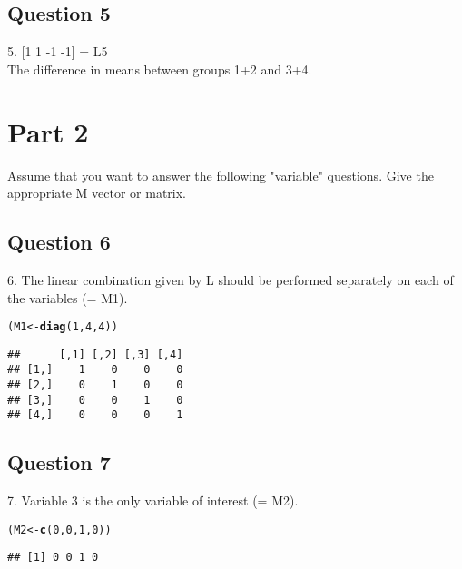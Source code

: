 \documentclass{article}\usepackage[]{graphicx}\usepackage[]{color}
\makeatletter
\newcommand{\hlnum}[1]{\textcolor[rgb]{0.686,0.059,0.569}{#1}}%
\newcommand{\hlstd}[1]{\textcolor[rgb]{0.345,0.345,0.345}{#1}}%
\newcommand{\hlkwb}[1]{\textcolor[rgb]{0.69,0.353,0.396}{#1}}%
\newcommand{\hlkwd}[1]{\textcolor[rgb]{0.737,0.353,0.396}{\textbf{#1}}}%
\newenvironment{kframe}{%
 \def\at@end@of@kframe{}%
 \ifinner\ifhmode%
  \def\at@end@of@kframe{\end{minipage}}%
  \begin{minipage}{\columnwidth}%
 \fi\fi%
 \def\FrameCommand##1{\hskip\@totalleftmargin \hskip-\fboxsep
 \colorbox{shadecolor}{##1}\hskip-\fboxsep
     \hskip-\linewidth \hskip-\@totalleftmargin \hskip\columnwidth}%
 \MakeFramed {\advance\hsize-\width
   \@totalleftmargin\z@ \linewidth\hsize
   \@setminipage}}%
 {\par\unskip\endMakeFramed%
 \at@end@of@kframe}
\newenvironment{knitrout}{}{} %
\makeatother
\begin{document}
\subsection{Question 5}
5. [1 1 -1 -1] = L5\\
The difference in means between groups 1+2 and 3+4.

\section{Part 2}
Assume that you want to answer the following "variable" questions. Give the appropriate M vector or matrix.  
\subsection{Question 6}
6. The linear combination given by L should be performed separately on each of the variables (= M1).

\begin{knitrout}
\color{fgcolor}\begin{kframe}
\begin{alltt}
\hlstd{(M1} \hlkwb{<-} \hlkwd{diag}\hlstd{(}\hlnum{1}\hlstd{,} \hlnum{4}\hlstd{,} \hlnum{4}\hlstd{))}
\end{alltt}
\begin{verbatim}
##      [,1] [,2] [,3] [,4]
## [1,]    1    0    0    0
## [2,]    0    1    0    0
## [3,]    0    0    1    0
## [4,]    0    0    0    1
\end{verbatim}
\end{kframe}
\end{knitrout}

\subsection{Question 7}
7. Variable 3 is the only variable of interest (= M2).  

\begin{knitrout}
\color{fgcolor}\begin{kframe}
\begin{alltt}
\hlstd{(M2} \hlkwb{<-} \hlkwd{c}\hlstd{(}\hlnum{0}\hlstd{,}\hlnum{0}\hlstd{,}\hlnum{1}\hlstd{,}\hlnum{0}\hlstd{))}
\end{alltt}
\begin{verbatim}
## [1] 0 0 1 0
\end{verbatim}
\end{kframe}
\end{knitrout}
\end{document}
